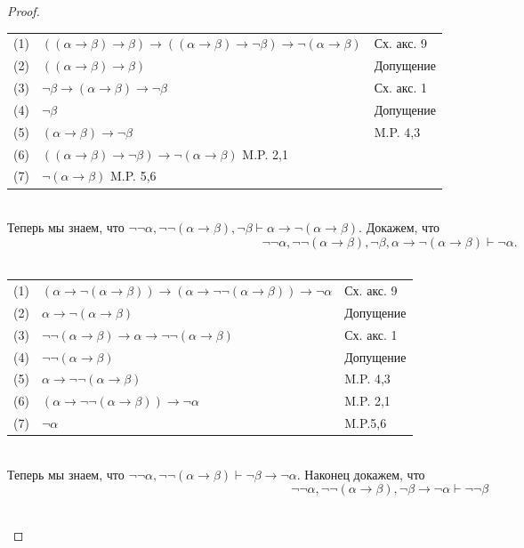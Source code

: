 \begin{proof}
\begin{enumerate}
\begin{itemize}
\begin{tabular}{lll}
(1) &$((\alpha \rightarrow \beta) \rightarrow \beta) \rightarrow ((\alpha \rightarrow \beta) \rightarrow \neg \beta) \rightarrow \neg(\alpha \rightarrow \beta)$& Сх. акс. 9\\
(2) &$((\alpha \rightarrow \beta) \rightarrow \beta)$& Допущение\\
(3) &$\neg \beta \rightarrow (\alpha \rightarrow \beta) \rightarrow \neg \beta$& Сх. акс. 1\\
(4) &$\neg \beta$& Допущение\\
(5) &$(\alpha \rightarrow \beta) \rightarrow \neg \beta$& M.P. 4,3\\
(6) &$((\alpha \rightarrow \beta) \rightarrow \neg \beta) \rightarrow \neg(\alpha \rightarrow \beta)$ M.P. 2,1\\
(7) &$\neg(\alpha \rightarrow \beta)$ M.P. 5,6\\
\end{tabular}\\
Теперь мы знаем, что $\neg \neg \alpha, \neg \neg (\alpha \rightarrow \beta), \neg \beta \vdash \alpha \rightarrow \neg (\alpha \rightarrow \beta)$. Докажем, что \[ \neg \neg \alpha, \neg \neg (\alpha \rightarrow \beta), \neg \beta, \alpha \rightarrow \neg (\alpha \rightarrow \beta) \vdash \neg \alpha.\] \\
\begin{tabular}{lll}
(1) &$(\alpha \rightarrow \neg (\alpha \rightarrow \beta)) \rightarrow (\alpha \rightarrow \neg \neg (\alpha \rightarrow \beta)) \rightarrow \neg \alpha$& Сх. акс. 9\\
(2) &$\alpha \rightarrow \neg (\alpha \rightarrow \beta)$&Допущение\\
(3) &$\neg \neg (\alpha \rightarrow \beta) \rightarrow \alpha \rightarrow \neg \neg (\alpha \rightarrow \beta)$& Сх. акс. 1\\
(4) &$\neg \neg (\alpha \rightarrow \beta)$& Допущение\\
(5) &$\alpha \rightarrow \neg \neg (\alpha \rightarrow \beta)$& M.P. 4,3\\
(6) &$(\alpha \rightarrow \neg \neg (\alpha \rightarrow \beta)) \rightarrow \neg \alpha$& M.P. 2,1\\
(7) &$\neg \alpha$& M.P.5,6\\
\end{tabular}\\
Теперь мы знаем, что $\neg \neg \alpha, \neg \neg (\alpha \rightarrow \beta) \vdash \neg \beta \rightarrow \neg \alpha$. Наконец докажем, что \[ \neg \neg \alpha, \neg \neg (\alpha \rightarrow \beta), \neg \beta \rightarrow \neg \alpha \vdash \neg \neg \beta\] \\

\end{itemize}
\end{enumerate}
\end{proof}
